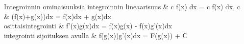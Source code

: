 \begin{eqtable-full}{Integroinnin ominaisuuksia \cite{MAT-01360} }
integroinnin lineaarisuus 		& \int c f(x) dx = c \int f(x) dx, \quad c \in {} \\ %
														& \int (f(x)+g(x))dx = \int f(x)dx + \int g(x)dx \\
osittaisintegrointi 			& \int f'(x)g(x)dx = f(x)g(x) - \int f(x)g'(x)dx \\ %
integrointi sijoituksen avulla 	& \int f(g(x))g'(x)dx = F(g(x)) + C \\ %
\end{eqtable-full}

\iffalse
Integroimiskaavoja \cite[s.42]{MAOL}
\begin{align*}
& \int 0 dx = C \\
& \int kdx = kx + C \\
& \int f'(x)(f(x))^n dx = \frac{(f(x))^{n+1}}{n+1} + C, \quad n \neq -1 \\
& \int \frac{f'(x)}{f(x)} dx = \ln |f(x)| + C, \quad f(x) \neq 0 \\
& \int \sin x dx = - \cos x + C \\
& \int \cos x dx = sin x + C \\
& \int \tan x dx = - \ln | \cos x | + C \\
& \int e^x dx = e^x + C \\
& \int f'(x)e^{f(x)} dx = e^{f(x)} + C \\
& \int a^x dx = \frac{a^x}{\ln a} + C, \quad a>0, a \neq 1 \\
& \log_a |x| dx = (log_a e)(x \ln |x| - x) + C, \quad a>0, a \neq 1 \\
& \int \frac{dx}{1+x^2} = \arctan x + C \\
& \int \frac{dx}{\sqrt{1-x^2}} = \arcsin x + C
\end{align*}
\fi


